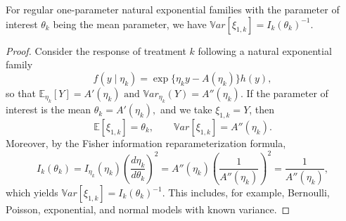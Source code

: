 
\begin{proposition}\label{prop:exp-fam}
	For regular one-parameter natural exponential families with the parameter of interest $\theta_k$ being the mean parameter, we have $\mathbb{V}ar\left[\xi_{1,k}\right] = I_k(\theta_k)^{-1}$.
\end{proposition}
\begin{proof}
	Consider the response of treatment $k$ following a natural exponential family
	\[
	f(y \mid \eta_k)
	=
	\exp\{\eta_k y - A(\eta_k)\} h(y),
	\]
	so that \(\mathbb{E}_{\eta_k}[Y] = A'(\eta_k) \text{ and }
	\mathbb{V}ar_{\eta_k}(Y) = A''(\eta_k).\) If the parameter of interest is the mean \(\theta_k = A'(\eta_k),\)
	and we take $\xi_{1,k}=Y$, then
	\[
	\mathbb{E}[\xi_{1,k}] = \theta_k,
	\qquad
	\mathbb{V}ar\left[\xi_{1,k}\right] = A''(\eta_k).
	\]
	Moreover, by the Fisher information reparameterization formula,
	\[
	I_k(\theta_k)
	=
	I_{\eta_k}(\eta_k)
	\left(\frac{d\eta_k}{d\theta_k}\right)^2
	=
	A''(\eta_k)\left(\frac{1}{A''(\eta_k)}\right)^2
	=
	\frac{1}{A''(\eta_k)},
	\]
	which yields \(\mathbb{V}ar\left[\xi_{1,k}\right] = I_k(\theta_k)^{-1}.\)
	This includes, for example, Bernoulli, Poisson, exponential, and normal models with known variance.
\end{proof}

